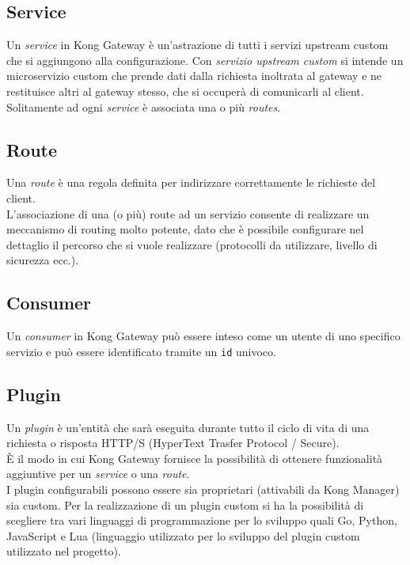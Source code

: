 \subsection{Service}\label{sec:kongservice}
Un \emph{service} in Kong Gateway è un'astrazione di tutti i servizi upstream custom che si aggiungono alla configurazione. Con \emph{servizio upstream custom} si intende un microservizio custom che prende dati dalla richiesta inoltrata al gateway e ne restituisce altri al gateway stesso, che si occuperà di comunicarli al client.\\
Solitamente ad ogni \emph{service} è associata una o più \emph{routes}.\\

\subsection{Route}\label{sec:kongroute}
Una \emph{route} è una regola definita per indirizzare correttamente le richieste del client.\\
L'associazione di una (o più) route ad un servizio consente di realizzare un meccanismo di routing molto potente, dato che è possibile configurare nel dettaglio il percorso che si vuole realizzare (protocolli da utilizzare, livello di sicurezza ecc.).\\

\subsection{Consumer}\label{sec:kongconsumer}
Un \emph{consumer} in Kong Gateway può essere inteso come un utente di uno specifico servizio e può essere identificato tramite un \texttt{id} univoco.

\subsection{Plugin}\label{sec:kongplugin}
Un \emph{plugin} è un'entità che sarà eseguita durante tutto il ciclo di vita di una richiesta o risposta HTTP/S (HyperText Trasfer Protocol / Secure).\\
È il modo in cui Kong Gateway fornisce la possibilità di ottenere funzionalità aggiuntive per un \emph{service} o una \emph{route}.\\
I plugin configurabili possono essere sia proprietari (attivabili da Kong Manager) sia custom. Per la realizzazione di un plugin custom si ha la possibilità di scegliere tra vari linguaggi di programmazione per lo sviluppo quali Go, Python, JavaScript e Lua (linguaggio utilizzato per lo sviluppo del plugin custom utilizzato nel progetto).\\ 

